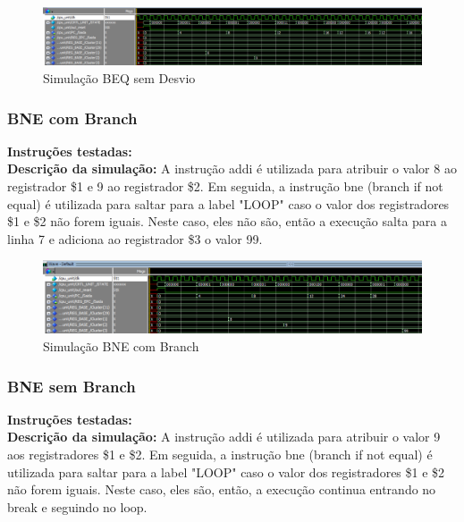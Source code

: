 \begin{figure}[htbp!]
\centering
\includegraphics[width=1\textwidth]{figure/simulacao_beq_sem_desvio.png}
\caption{Simulação BEQ sem Desvio} 
\label{fig:imagem_massa}
\end{figure}

\subsubsection{BNE com Branch}
\textbf{Instruções testadas:}
 \\

\textbf{Descrição da simulação:} A instrução addi é utilizada para atribuir o valor 8 ao registrador \$1 e 9 ao registrador \$2. Em seguida, a instrução bne (branch if not equal) é utilizada para saltar para a label "LOOP" caso o valor dos registradores \$1 e \$2 não forem iguais. Neste caso, eles não são, então a execução salta para a linha 7 e adiciona ao registrador \$3 o valor 99. \\

\begin{figure}[htbp!]
\centering
\includegraphics[width=1\textwidth]{figure/simulacao_bne_com_branch.png}
\caption{Simulação BNE com Branch} 
\label{fig:imagem_massa}
\end{figure}

\subsubsection{BNE sem Branch}
\textbf{Instruções testadas:}
 \\

\textbf{Descrição da simulação:} A instrução addi é utilizada para atribuir o valor 9 aos registradores \$1 e \$2. Em seguida, a instrução bne (branch if not equal) é utilizada para saltar para a label "LOOP" caso o valor dos registradores \$1 e \$2 não forem iguais. Neste caso, eles são, então, a execução continua entrando no break e seguindo no loop.\\

